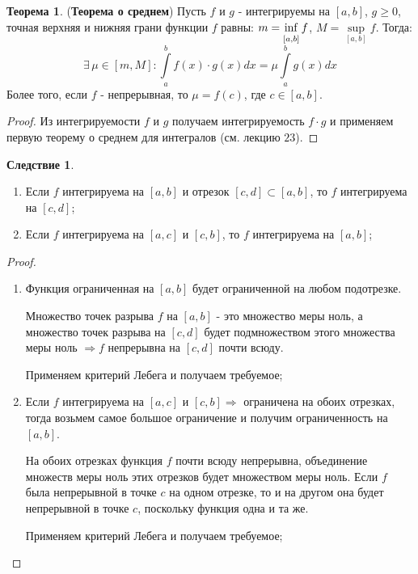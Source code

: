 \documentclass[12pt]{article}
\theoremstyle{definition}
\newtheorem{theorem}{Теорема}
\newtheorem{corollary}{Следствие}
\newcommand{\ddint}[2]{\displaystyle\int\limits_{#1}^{#2}}
\newcommand{\newinf}{\mathop{\mathrm{inf}\vphantom{\mathrm{sup}}}}
\begin{document}
\begin{theorem}(\textbf{Теорема о среднем})
	Пусть $f$ и $g$ - интегрируемы на $[a,b]$, $g \geq 0$, точная верхняя и нижняя грани функции $f$ равны: $m = \newinf\limits_{[a,b]}f$, $M = \sup\limits_{[a,b]}f$. Тогда: 
	$$
		\exists \, \mu \in [m,M] \colon \ddint{a}{b}f(x){\cdot}g(x)dx = \mu\ddint{a}{b}g(x)dx
	$$
	Более того, если $f$ - непрерывная, то $\mu = f(c)$, где $c \in [a,b]$.
\end{theorem}
\begin{proof}
	Из интегрируемости $f$ и $g$ получаем интегрируемость $f{\cdot}g$ и применяем первую теорему о среднем для интегралов (см. лекцию $23$).
\end{proof}

\begin{corollary}\hfill
	\begin{enumerate}[label={\arabic*)}]
		\item Если $f$ интегрируема на $[a,b]$ и отрезок $[c,d] \subset [a,b]$, то $f$ интегрируема на $[c,d]$;
		\item Если $f$ интегрируема на $[a,c]$ и $[c,b]$, то $f$ интегрируема на $[a,b]$;
	\end{enumerate}
\end{corollary}
\begin{proof}\hfill
	\begin{enumerate}[label={\arabic*)}]
		\item Функция ограниченная на $[a,b]$ будет ограниченной на любом подотрезке. 
		
		Множество точек разрыва $f$ на $[a,b]$ - это множество меры ноль, а множество точек разрыва на $[c,d]$ будет подмножеством этого множества меры ноль $\Rightarrow f$ непрерывна на $[c,d]$ почти всюду.
		
		Применяем критерий Лебега и получаем требуемое;
		\item Если $f$ интегрируема на $[a,c]$ и $[c,b] \Rightarrow$ ограничена на обоих отрезках, тогда возьмем самое большое ограничение и получим ограниченность на $[a,b]$. 
		
		На обоих отрезках функция $f$ почти всюду непрерывна, объединение множеств меры ноль этих отрезков будет множеством меры ноль. Если $f$ была непрерывной в точке $c$ на одном отрезке, то и на другом она будет непрерывной в точке $c$, поскольку функция одна и та же.
		
		Применяем критерий Лебега и получаем требуемое;
	\end{enumerate}
\end{proof}
\end{document}
